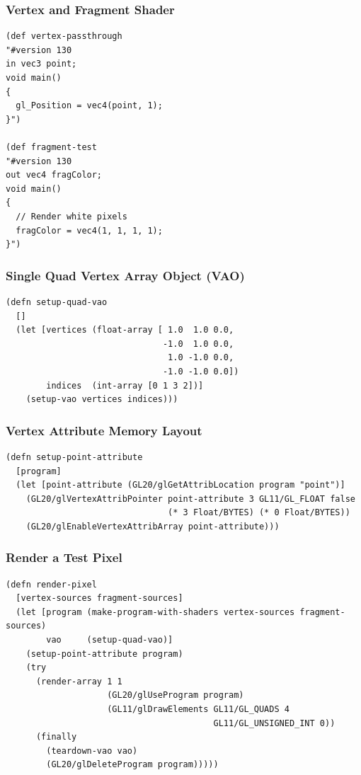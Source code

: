 \documentclass[aspectratio=169,11pt,xcolor=dvipsnames]{beamer}
\begin{document}
\begin{frame}[fragile]
  \frametitle{Vertex and Fragment Shader}
  \begin{verbatim}
(def vertex-passthrough
"#version 130
in vec3 point;
void main()
{
  gl_Position = vec4(point, 1);
}")

(def fragment-test
"#version 130
out vec4 fragColor;
void main()
{
  // Render white pixels
  fragColor = vec4(1, 1, 1, 1);
}")
  \end{verbatim}
\end{frame}

\begin{frame}[fragile]
  \frametitle{Single Quad Vertex Array Object (VAO)}
  \begin{verbatim}
(defn setup-quad-vao
  []
  (let [vertices (float-array [ 1.0  1.0 0.0,
                               -1.0  1.0 0.0,
                                1.0 -1.0 0.0,
                               -1.0 -1.0 0.0])
        indices  (int-array [0 1 3 2])]
    (setup-vao vertices indices)))
  \end{verbatim}
\end{frame}

\begin{frame}[fragile]
  \frametitle{Vertex Attribute Memory Layout}
  \begin{verbatim}
(defn setup-point-attribute
  [program]
  (let [point-attribute (GL20/glGetAttribLocation program "point")]
    (GL20/glVertexAttribPointer point-attribute 3 GL11/GL_FLOAT false
                                (* 3 Float/BYTES) (* 0 Float/BYTES))
    (GL20/glEnableVertexAttribArray point-attribute)))
  \end{verbatim}
\end{frame}

\begin{frame}[fragile]
  \frametitle{Render a Test Pixel}
  \begin{verbatim}
(defn render-pixel
  [vertex-sources fragment-sources]
  (let [program (make-program-with-shaders vertex-sources fragment-sources)
        vao     (setup-quad-vao)]
    (setup-point-attribute program)
    (try
      (render-array 1 1
                    (GL20/glUseProgram program)
                    (GL11/glDrawElements GL11/GL_QUADS 4
                                         GL11/GL_UNSIGNED_INT 0))
      (finally
        (teardown-vao vao)
        (GL20/glDeleteProgram program)))))
  \end{verbatim}
\end{frame}
\end{document}
